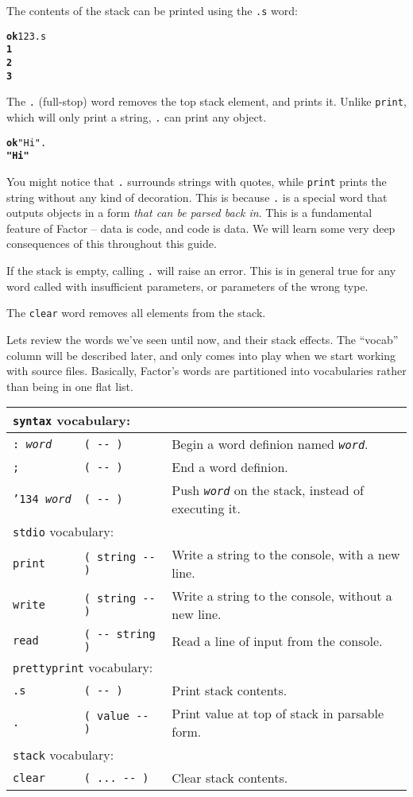 \documentclass[english]{book}
\newcommand{\ttbackslash}{\char'134}
\newcommand{\wordtable}[1]{{
\begin{tabularx}{12cm}{|l l X|}
#1
\hline
\end{tabularx}}}
\newcommand{\tabvocab}[1]{
\hline
\multicolumn{3}{|l|}{
\rule[-2mm]{0mm}{6mm}
\texttt{#1} vocabulary:}
\\
\hline
}
\begin{document}
The contents of the stack can be printed using the \texttt{.s} word:

\begin{alltt}
\textbf{ok} 1 2 3 .s
\textbf{1
2
3}
\end{alltt}

The \texttt{.} (full-stop) word removes the top stack element, and prints it. Unlike \texttt{print}, which will only print a string, \texttt{.} can print any object.

\begin{alltt}
\textbf{ok} "Hi" .
\textbf{"Hi"}
\end{alltt}

You might notice that \texttt{.} surrounds strings with quotes, while \texttt{print} prints the string without any kind of decoration. This is because \texttt{.} is a special word that outputs objects in a form \emph{that can be parsed back in}. This is a fundamental feature of Factor -- data is code, and code is data. We will learn some very deep consequences of this throughout this guide.

If the stack is empty, calling \texttt{.} will raise an error. This is in general true for any word called with insufficient parameters, or parameters of the wrong type.

The \texttt{clear} word removes all elements from the stack.

Lets review the words  we've seen until now, and their stack effects. The ``vocab'' column will be described later, and only comes into play when we start working with source files. Basically, Factor's words are partitioned into vocabularies rather than being in one flat list.

\wordtable{
\tabvocab{syntax}
\texttt{:~\emph{word}}&
\texttt{( -{}- )}&
Begin a word definion named \texttt{\emph{word}}.\\
\texttt{;}&
\texttt{( -{}- )}&
End a word definion.\\
\texttt{\ttbackslash\ \emph{word}}&
\texttt{( -{}- )}&
Push \texttt{\emph{word}} on the stack, instead of executing it.\\
\tabvocab{stdio}
\texttt{print}&
\texttt{( string -{}- )}&
Write a string to the console, with a new line.\\
\texttt{write}&
\texttt{( string -{}- )}&
Write a string to the console, without a new line.\\
\texttt{read}&
\texttt{( -{}- string )}&
Read a line of input from the console.\\
\tabvocab{prettyprint}
\texttt{.s}&
\texttt{( -{}- )}&
Print stack contents.\\
\texttt{.}&
\texttt{( value -{}- )}&
Print value at top of stack in parsable form.\\
\tabvocab{stack}
\texttt{clear}&
\texttt{( ...~-{}- )}&
Clear stack contents.\\
}
\end{document}
